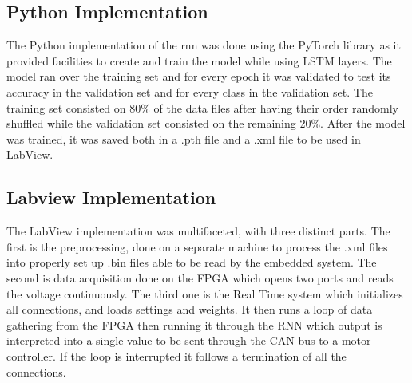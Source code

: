 \subsection{Python Implementation}
The Python implementation of the \acrshort{rnn} was done using the PyTorch library as it provided facilities 
to create and train the model while using LSTM layers. The model ran over the training set and for every epoch
it was validated to test its accuracy in the validation set and for every class in the validation set.
The training set consisted on 80\% of the data files after having their order randomly shuffled while the validation set consisted on the remaining 20\%. 
After the model was trained, it was saved both in a .pth file and a .xml file to be used in LabView.

\subsection{Labview Implementation}
The LabView implementation was multifaceted, with three distinct parts. The first is the preprocessing, done on a separate machine to process the .xml files into properly set up .bin files able
to be read by the embedded system. The second is data acquisition done on the \acrfull{FPGA} which opens two ports and reads the voltage continuously. The third one is the Real Time system which
initializes all connections, and loads settings and weights. It then runs a loop of data gathering from the \acrshort{FPGA} then running it through the RNN which output is interpreted into a single 
value to be sent through the CAN bus to a motor controller. If the loop is interrupted it follows a termination of all the connections.
